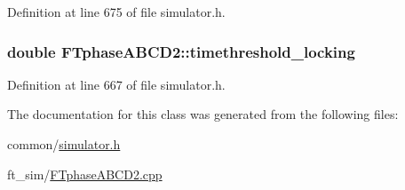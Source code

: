 Definition at line 675 of file simulator.h.

\hypertarget{classFTphaseABCD2_a8652ab249203a6c08bff9ad20b591e44}{
\subsubsection[{timethreshold\_\-locking}]{\setlength{\rightskip}{0pt plus 5cm}double {\bf FTphaseABCD2::timethreshold\_\-locking}}}
\label{classFTphaseABCD2_a8652ab249203a6c08bff9ad20b591e44}


Definition at line 667 of file simulator.h.



The documentation for this class was generated from the following files:\begin{DoxyCompactItemize}
\item 
common/\hyperlink{simulator_8h}{simulator.h}\item 
ft\_\-sim/\hyperlink{FTphaseABCD2_8cpp}{FTphaseABCD2.cpp}\end{DoxyCompactItemize}
